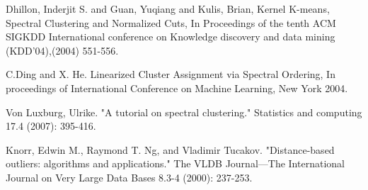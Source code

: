 \begin{thebibliography}{9}
Dhillon, Inderjit S. and Guan, Yuqiang and Kulis, Brian, Kernel K-means, Spectral Clustering and Normalized Cuts, In Proceedings of the tenth ACM SIGKDD International conference on Knowledge discovery and data mining (KDD’04),(2004) 551-556.

C.Ding and X. He. Linearized Cluster Assignment via Spectral Ordering, In proceedings of International Conference on Machine Learning, New York 2004.

Von Luxburg, Ulrike. "A tutorial on spectral clustering." Statistics and computing 17.4 (2007): 395-416.

Knorr, Edwin M., Raymond T. Ng, and Vladimir Tucakov. "Distance-based outliers: algorithms and applications." The VLDB Journal—The International Journal on Very Large Data Bases 8.3-4 (2000): 237-253.

\end{thebibliography}
